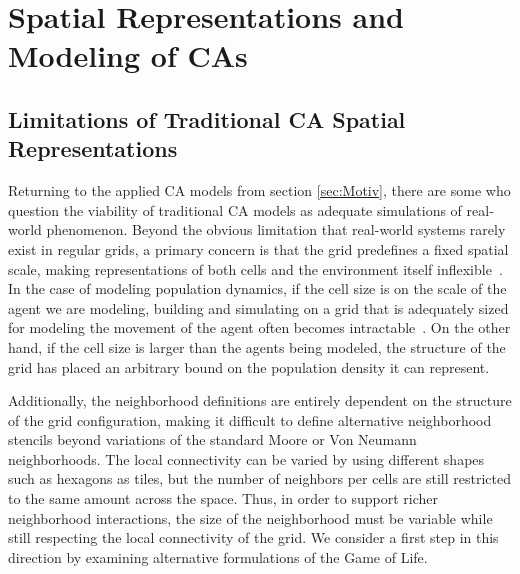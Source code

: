\documentclass[a4paper,11pt]{report}
\begin{document}

\section{Spatial Representations and Modeling of CAs}
\label{sec:Model}
\subsection{Limitations of Traditional CA Spatial Representations}

Returning to the applied CA models from section \ref{sec:Motiv}, there are some who question the viability of traditional CA models as adequate simulations of real-world phenomenon. Beyond the obvious limitation that real-world systems rarely exist in regular grids, a primary concern is that the grid predefines a fixed spatial scale, making representations of both cells and the environment itself inflexible~\cite{he98}. In the case of modeling population dynamics, if the cell size is on the scale of the agent we are modeling, building and simulating on a grid that is adequately sized for modeling the movement of the agent often becomes intractable~\cite{bi07}. On the other hand, if the cell size is larger than the agents being modeled, the structure of the grid has placed an arbitrary bound on the population density it can represent.

Additionally, the neighborhood definitions are entirely dependent on the structure of the grid configuration, making it difficult to define alternative neighborhood stencils beyond variations of the standard Moore or Von Neumann neighborhoods. The local connectivity can be varied by using different shapes such as hexagons as tiles, but the number of neighbors per cells are still restricted to the same amount across the space. Thus, in order to support richer neighborhood interactions, the size of the neighborhood must be variable while still respecting the local connectivity of the grid. We consider a first step in this direction by examining alternative formulations of the Game of Life.

\end{document}
